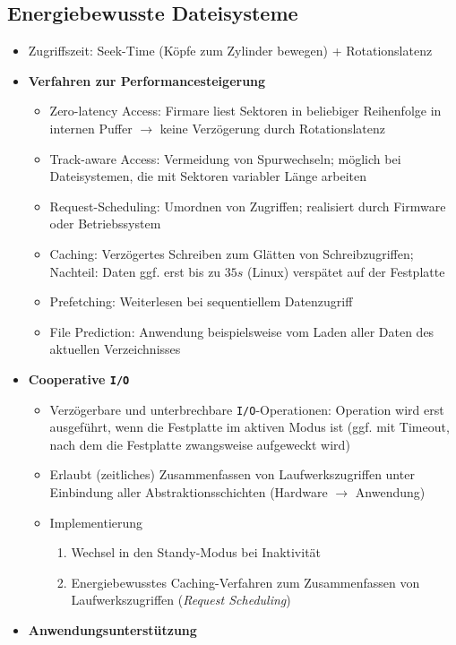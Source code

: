 \subsection{Energiebewusste Dateisysteme}
\begin{itemize}
	\item Zugriffszeit: Seek-Time (Köpfe zum Zylinder bewegen) + Rotationslatenz
	\item \textbf{Verfahren zur Performancesteigerung}
	\begin{itemize}
		\item Zero-latency Access: Firmare liest Sektoren in beliebiger Reihenfolge in internen Puffer \(\rightarrow\) keine Verzögerung durch Rotationslatenz
		\item Track-aware Access: Vermeidung von Spurwechseln; möglich bei Dateisystemen, die mit Sektoren variabler Länge arbeiten
		\item Request-Scheduling: Umordnen von Zugriffen; realisiert durch Firmware oder Betriebssystem
		\item Caching: Verzögertes Schreiben zum Glätten von Schreibzugriffen; Nachteil: Daten ggf. erst bis zu \(35s\) (Linux) verspätet auf der Festplatte
		\item Prefetching: Weiterlesen bei sequentiellem Datenzugriff
		\item File Prediction: Anwendung beispielsweise vom Laden aller Daten des aktuellen Verzeichnisses
	\end{itemize}
	\item \textbf{Cooperative \texttt{I/O}}
	\begin{itemize}
		\item Verzögerbare und unterbrechbare \texttt{I/O}-Operationen: Operation wird erst ausgeführt, wenn die Festplatte im aktiven Modus ist (ggf. mit Timeout, nach dem die Festplatte zwangsweise aufgeweckt wird)
		\item Erlaubt (zeitliches) Zusammenfassen von Laufwerkszugriffen unter Einbindung aller Abstraktionsschichten (Hardware \(\rightarrow\) Anwendung)
		\item Implementierung
		\begin{enumerate}
			\item Wechsel in den Standy-Modus bei Inaktivität
			\item Energiebewusstes Caching-Verfahren zum Zusammenfassen von Laufwerkszugriffen (\textit{Request Scheduling})
		\end{enumerate}
	\end{itemize}
	\item \textbf{Anwendungsunterstützung}

\end{itemize}
